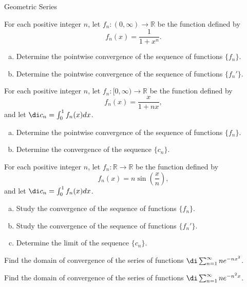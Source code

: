\begin{example}[label=230305_16]{Geometric Series}
\atc
\begin{question}{\themyquestion}
 For each positive integer $n$, let $f_n:(0,\infty)\to\mathbb{R}$ be the function defined by
 \[f_n(x)=\frac{1}{1+x^n}.\]  
  \begin{enumerate}[(a)]
   \item
  Determine the pointwise convergence of the sequence  of functions $\{f_n\}$.
 \item   Determine the pointwise convergence of the sequence of functions  $\{f_n'\}$.
 \end{enumerate}
\end{question}

\atc
\begin{question}{\themyquestion}
For each positive integer $n$, let $f_n:[0,\infty)\to\mathbb{R}$ be the function defined by
 \[f_n(x)=\frac{x}{1+nx},\]and  let
$\di c_n=\int_0^1f_n(x)dx$. 
\begin{enumerate}[(a)]
   \item  Determine the pointwise  convergence of the sequence of functions $\{f_n\}$.
   \item Determine the  convergence of the sequence $\{c_n\}$.
 \end{enumerate}
\end{question}
 


\atc
\begin{question}{\themyquestion}
For each positive integer $n$, let $f_n:\mathbb{R}\to\mathbb{R}$ be the function defined by
 \[f_n(x)=n\sin\left(\frac{x}{n}\right),\]  
 and let
$\di c_n=\int_0^1f_n(x)dx$.
\begin{enumerate}[(a)]
 \item  Study the  convergence of the sequence  of functions $\{f_n\}$.
\item  Study the  convergence of the sequence  of functions  $\{f_n'\}$.
\item Determine the limit of the sequence $\{c_n\}$.
 \end{enumerate}
\end{question}
 
 
 \atc
\begin{question}{\themyquestion}Find the domain of convergence of the series of functions $\di\sum_{n=1}^{\infty}ne^{-nx^2}$.
\end{question}
  \atc
\begin{question}{\themyquestion}Find the domain of convergence of the series of functions $\di\sum_{n=1}^{\infty}ne^{-n^2x}$.
\end{question}
 

\end{example}
